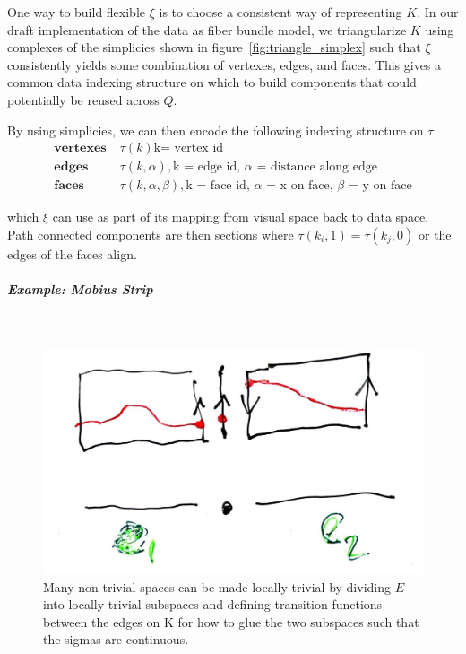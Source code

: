 \documentclass[../main.tex]{subfiles}
\begin{document}
One way to build flexible $\xi$ is to choose a consistent way of representing $K$. In our draft implementation of the data as fiber bundle model, we triangularize $K$ using complexes of the simplicies shown in figure~\ref{fig:triangle_simplex} such that $\xi$ consistently yields some combination of vertexes, edges, and faces. This gives a common data indexing structure on which to build components that could potentially be reused across $Q$.

By using simplicies, we can then encode the following indexing structure on $\tau$
\begin{align*}
    \textbf{vertexes}\;& \tau(k) \text{k= vertex id}\\
    \textbf{edges}\;& \tau(k,\alpha), \text{k = edge id, $\alpha$ = distance along edge} \\
    \textbf{faces}\;& \tau(k,\alpha, \beta), \text{k = face id, $\alpha$ = x on face, $\beta$ = y on face}
\end{align*}

which $\xi$ can use as part of its mapping from visual space back to data space. Path connected components are then sections where $\tau(k_{i},1) = \tau(k_{j},0)$ or the edges of the faces align.  

\subparagraph{Example: Mobius Strip}\mbox{}\\
\begin{figure}[H]
    \label{fig:data_base_transition}
    \includegraphics[width=\textwidth]{figures/math/transition_functions.png}
    \caption{Many non-trivial spaces can be made locally trivial by dividing $E$ into locally trivial subspaces and defining transition functions between the edges on K for how to glue the two subspaces such that the sigmas are continuous.}
\end{figure}
\end{document}
